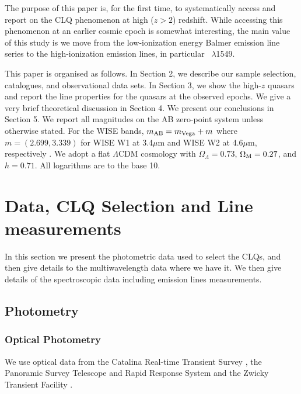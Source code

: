 \documentclass[fleqn,usenatbib]{mnras}
\begin{document}
The purpose of this paper is, for the first time, to systematically
access and report on the CLQ phenomenon at high ($z>2$)
redshift. While accessing this phenomenon at an earlier cosmic epoch
is somewhat interesting, the main value of this study is we move from
the low-ionization energy Balmer emission line series to the
high-ionization emission lines, in particular \civ\ $\lambda$1549.

This paper is organised as follows. In Section 2, we describe our
sample selection, catalogues, and observational data sets.  In Section
3, we show the high-$z$ quasars and report the line properties for the
quasars at the observed epochs.  We give a very brief theoretical
discussion in Section 4. We present our conclusions in Section 5.  We
report all magnitudes on the AB zero-point system \citep{Oke_Gunn1983,
Fukugita1996} unless otherwise stated. For the WISE bands, $m_{\rm AB}
= m_{\rm Vega} + m$ where $m = (2.699, 3.339)$ for WISE W1 at
3.4$\mu$m and WISE W2 at 4.6$\mu$m, respectively \citep{Cutri2011, Cutri2013}. We
adopt a flat $\Lambda$CDM cosmology with $\Omega_{\Lambda} = 0.73 $,
$\Omega_{\rm M} = 0.27$, and $h = 0.71$. All logarithms are to the base 10. 


\section{Data, CLQ Selection and Line measurements}
In this section we present the photometric data used to select the
CLQs, and then give details to the multiwavelength data where we have
it. We then give details of the spectroscopic data including emission
lines measurements.

\subsection{Photometry}
\subsubsection{Optical Photometry}
We use optical data from the Catalina Real-time Transient Survey
\citep[CRTS;][]{Drake2009, Mahabal2011}, the Panoramic Survey
Telescope and Rapid Response System \citep[PanSTARRS;][]{Kaiser2010,
Stubbs2010, Tonry2012, Magnier2013} and the Zwicky Transient Facility
\citep[ZTF;][]{Bellm2019_ZTFOverview}. 
\end{document}
